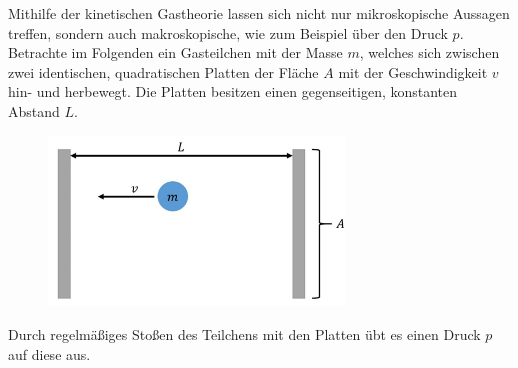 \documentclass[../kl10.tex]{subfiles}
\begin{document}
Mithilfe der kinetischen Gastheorie lassen sich nicht nur mikroskopische Aussagen treffen, sondern auch makroskopische, wie zum Beispiel über den Druck $p$. Betrachte im Folgenden ein Gasteilchen mit der Masse $m$, welches sich zwischen zwei identischen, quadratischen Platten der Fläche $A$ mit der Geschwindigkeit $v$ hin- und herbewegt. Die Platten besitzen einen gegenseitigen, konstanten Abstand $L$.


\begin{figure}[H]
    \centering
    \includegraphics[width=0.7\textwidth]{2024/Abbildungen/Kinetisch_Gas/Teilchen_zwischen_Platten.png}
\end{figure}
Durch regelmäßiges Stoßen des Teilchens mit den Platten übt es einen Druck $p$ auf diese aus. 

\newpage

\end{document}
